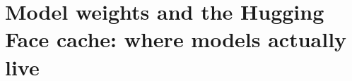 \chapter{Model weights and the Hugging Face cache: where models actually live}
\label{ch:model-weights-and-the-hugging-face}

